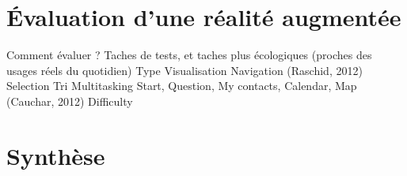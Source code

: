 \section*{Évaluation d'une réalité augmentée}
Comment évaluer ? Taches de tests, et taches plus écologiques (proches des usages réels du quotidien) \cite{DuenserGrassetBillinghurst2008}
    Type
        Visualisation 
        Navigation \cite{EnsFinneganIrani2014} (Raschid, 2012) 
        Selection \cite{EnsFinneganIrani2014}
        Tri \cite{RobertsonCzerwinskiLarsonEtAl1998}
        Multitasking 
            Start, Question, My contacts, Calendar, Map (Cauchar, 2012) \cite{EnsFinneganIrani2014} 
    Difficulty


\section*{Synthèse}